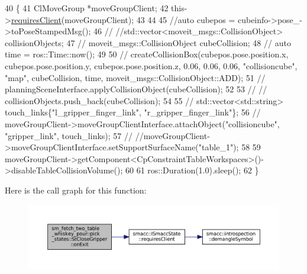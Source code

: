 \begin{DoxyCode}
40          \{
41             ClMoveGroup *moveGroupClient;
42             this->\hyperlink{classsmacc_1_1ISmaccState_a7f95c9f0a6ea2d6f18d1aec0519de4ac}{requiresClient}(moveGroupClient);
43 
44 
45             \textcolor{comment}{//auto cubepos = cubeinfo->pose\_->toPoseStampedMsg();}
46             \textcolor{comment}{// //std::vector<moveit\_msgs::CollisionObject> collisionObjects;}
47             \textcolor{comment}{// moveit\_msgs::CollisionObject cubeCollision;}
48             \textcolor{comment}{// auto time = ros::Time::now();}
49 
50             \textcolor{comment}{// createCollisionBox(cubepos.pose.position.x, cubepos.pose.position.y,
       cubepos.pose.position.z, 0.06, 0.06, 0.06, "collisioncube", "map",  cubeCollision, time, moveit\_msgs::CollisionObject::ADD);}
51             \textcolor{comment}{// planningSceneInterface.applyCollisionObject(cubeCollision);}
52 
53             \textcolor{comment}{// // collisionObjects.push\_back(cubeCollision);}
54             
55             \textcolor{comment}{// std::vector<std::string> touch\_links\{"l\_gripper\_finger\_link", "r\_gripper\_finger\_link"\};}
56             \textcolor{comment}{// moveGroupClient->moveGroupClientInterface.attachObject("collisioncube", "gripper\_link",
       touch\_links);}
57             \textcolor{comment}{// //moveGroupClient->moveGroupClientInterface.setSupportSurfaceName("table\_1");}
58             
59             moveGroupClient->getComponent<CpConstraintTableWorkspaces>()->disableTableCollisionVolume();
60 
61             ros::Duration(1.0).sleep();
62          \}
\end{DoxyCode}
Here is the call graph for this function\+:
\nopagebreak
\begin{figure}[H]
\begin{center}
\leavevmode
\includegraphics[width=350pt]{structsm__fetch__two__table__whiskey__pour_1_1pick__states_1_1StCloseGripper_a0b5943b8f0b5d64d4e0fe9f5cf058050_cgraph}
\end{center}
\end{figure}
\mbox{\label{structsm__fetch__two__table__whiskey__pour_1_1pick__states_1_1StCloseGripper_a9b7ed7f88613b43546c16cd5f525a860}} 

